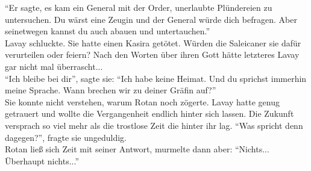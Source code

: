 ``Er sagte, es kam ein General mit der Order, unerlaubte Plündereien zu untersuchen. Du wärst eine 
Zeugin und der General würde dich befragen. Aber seinetwegen kannst du auch abauen und 
untertauchen.''\\
Lavay schluckte. Sie hatte einen Kasira getötet. Würden die Saleicaner sie dafür verurteilen oder 
feiern? Nach den Worten über ihren Gott hätte letzteres Lavay gar nicht mal überrascht...\\
``Ich bleibe bei dir'', sagte sie: ``Ich habe keine Heimat. Und du sprichst immerhin meine 
Sprache. Wann brechen wir zu deiner Gräfin auf?''\\
Sie konnte nicht verstehen, warum Rotan noch zögerte. Lavay hatte genug getrauert und wollte die 
Vergangenheit endlich hinter sich lassen. Die Zukunft versprach so viel mehr als die trostlose Zeit 
die hinter ihr lag. ``Was spricht denn dagegen?'', fragte sie ungeduldig.\\
Rotan ließ sich Zeit mit seiner Antwort, murmelte dann aber: ``Nichts... Überhaupt nichts...''\\

